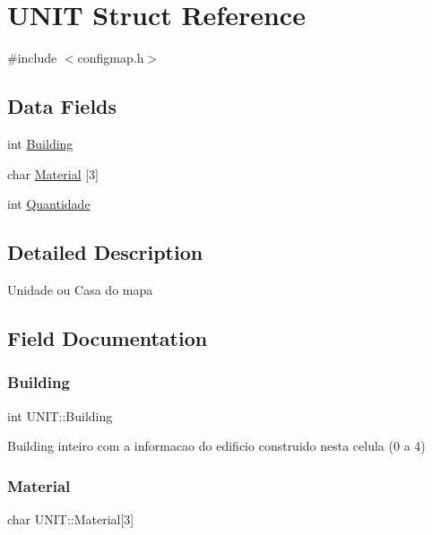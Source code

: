 \hypertarget{struct_u_n_i_t}{}\section{U\+N\+IT Struct Reference}
\label{struct_u_n_i_t}


{\ttfamily \#include $<$configmap.\+h$>$}

\subsection*{Data Fields}
\begin{DoxyCompactItemize}
\item 
int \mbox{\hyperlink{struct_u_n_i_t_ae9c30c2033387371329a35aa7c628ebc}{Building}}
\item 
char \mbox{\hyperlink{struct_u_n_i_t_a8e11b1a42f3f380755b3864a45a13df9}{Material}} \mbox{[}3\mbox{]}
\item 
int \mbox{\hyperlink{struct_u_n_i_t_a1878ea7b1f85a363ffd2ceeefff6e1ee}{Quantidade}}
\end{DoxyCompactItemize}


\subsection{Detailed Description}
Unidade ou Casa do mapa 

\subsection{Field Documentation}
\mbox{\label{struct_u_n_i_t_ae9c30c2033387371329a35aa7c628ebc}} 
\subsubsection{\texorpdfstring{Building}{Building}}
{\footnotesize\ttfamily int U\+N\+I\+T\+::\+Building}

Building inteiro com a informacao do edificio construido nesta celula (0 a 4) \mbox{\label{struct_u_n_i_t_a8e11b1a42f3f380755b3864a45a13df9}} 
\subsubsection{\texorpdfstring{Material}{Material}}
{\footnotesize\ttfamily char U\+N\+I\+T\+::\+Material\mbox{[}3\mbox{]}}


